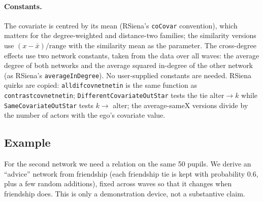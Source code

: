 \paragraph{Constants.} The covariate is centred by its mean (RSiena's \texttt{coCovar} convention), which matters for the degree-weighted and distance-two families; the similarity versions use $(x-\bar x)/\text{range}$ with the similarity mean as the parameter. The cross-degree effects use two network constants, taken from the data over all waves: the average degree of both networks and the average squared in-degree of the other network (as RSiena's \texttt{averageInDegree}). No user-supplied constants are needed. RSiena quirks are copied: \texttt{alldifcovnetnetin} is the same function as \texttt{contrastcovnetnetin}; \texttt{DifferentCovariateOutStar} tests the tie alter$\to$$k$ while \texttt{SameCovariateOutStar} tests $k\to$ alter; the average-sameX versions divide by the number of actors with the ego's covariate value.

\subsection{Example}

For the second network we need a relation on the same 50 pupils. We derive an ``advice'' network from friendship (each friendship tie is kept with probability 0.6, plus a few random additions), fixed across waves so that it changes when friendship does. This is only a demonstration device, not a substantive claim.

